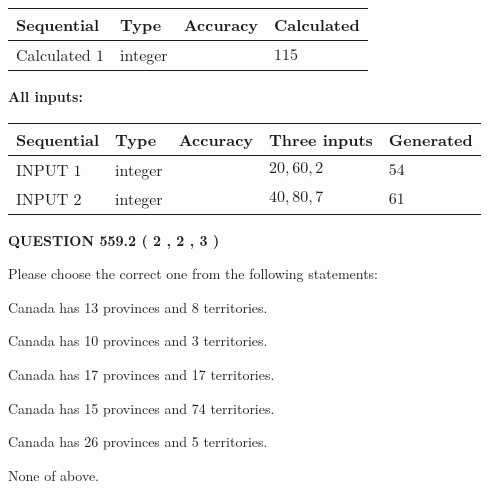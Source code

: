 \documentclass[12pt]{article}
\begin{document}
   
   
   
\noindent{}
   
   
  
  
\noindent\begin{tabular}{|l|l|l|l|}
\hline
 Sequential & Type & Accuracy & Calculated \\ 
\hline
 
 
  Calculated $  1 $ & integer &  & 
  $ 115 $ 
 \\  \hline  
 \end{tabular}
   
   
   
   
\noindent\vspace{0.1in}\hspace{-0.08in} {\textbf{\Large{All inputs: }}}
   
   
  
  
\noindent\begin{tabular}{|l|l|l|l|l|}
\hline
 Sequential & Type & Accuracy & Three inputs & Generated \\ 
\hline
 
 
  INPUT $  1 $ & integer &  & $
 20
 , 
 60
 , 
 2
 $ & $ 54 $ 
 \\  \hline  
 
 
  INPUT $  2 $ & integer &  & $
 40
 , 
 80
 , 
 7
 $ & $ 61 $ 
 \\  \hline  
 \end{tabular}
   
   
  
\vspace{0.2in}
  
{\textbf{\Large{QUESTION
559.2 
 ( 2 , 2 , 3 )
}}}
  
  
Please choose the correct one from the following statements:
 
 
Canada has  13 provinces and  8 territories.
 
 
Canada has 10  provinces and 3 territories.
 
 
Canada has  17 provinces and  17 territories.
 
 
Canada has  15 provinces and  74 territories.
 
 
Canada has  26 provinces and  5 territories.
 
 
 None of above.
 
\end{document}
